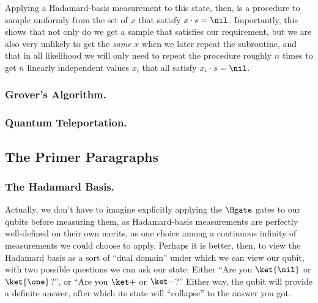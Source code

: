     Applying a Hadamard-basis measurement to this state, then, is a procedure to 
      sample uniformly from the set of $x$ that satisfy $x \cdot s = \nil$.
      Importantly, this shows that not only do we get a sample that satisfies
      our requirement, but we are also very unlikely to get the
      \emph{same} $x$ when we later repeat the subroutine, and that
      in all likelihood we will only need to repeat the procedure roughly $n$
      times to get $n$ linearly independent values $x_i$ that all satisfy 
      $x_i \cdot s = \nil$.

    \subsubsection{Grover's Algorithm.}

    \subsubsection{Quantum Teleportation.}

  \clearpage
  \subsection{The Primer Paragraphs}
    \subsubsection{The Hadamard Basis.}
      Actually, we don't have to imagine explicitly applying the $\Hgate$ gates
        to our qubits before measuring them, as Hadamard-basis measurements
        are perfectly well-defined on their own merits, as one choice among a
        continuous infinity of measurements we could choose to apply.
        Perhaps it is better, then, to view the Hadamard basis as a sort of
        ``dual domain'' under which we can view our qubit,
	      with two possible questions we can ask our state: 
	      Either ``Are you $\ket{\nil}$ or $\ket{\one}$?'', or 
	      ``Are you $\ket +$ or $\ket -$?'' Either way, 
	      the qubit will provide a definite answer, after which its state will 
        ``collapse'' to the answer you got.


